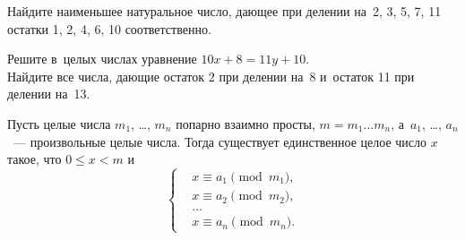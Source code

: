 


\begingroup
    \ifdefined\mathup
        \providecommand\eulerphi{\mathup{\mupphi}}%
    \fi
    \ifdefined\upphi
        \providecommand\eulerphi{\upphi}%
    \fi
    \providecommand\eulerphi{\phi}%

\begin{exercises}

\item
Найдите наименьшее натуральное число, дающее при делении на~2, 3, 5, 7, 11
остатки 1, 2, 4, 6, 10 соответственно.

\item{}
\subproblem
Решите в~целых числах уравнение $10 x + 8 = 11 y + 10$.
\\
\subproblem
Найдите все числа, дающие остаток 2 при делении на~8 и~остаток 11 при делении на~13.

\end{exercises}

Пусть целые числа $m_{1}$, \ldots, $m_{n}$ попарно взаимно просты,
$m = m_{1} \ldots m_{n}$, а~$a_{1}$, \ldots, $a_{n}$~--- произвольные целые
числа.
Тогда существует единственное целое число $x$ такое, что $0 \leq x < m$ и%
\[ \left\{ \begin{aligned} &
    x \equiv a_1 \pmod {m_1}
, \\ &
    x \equiv a_2 \pmod {m_2}
, \\ & \ldots \\ &
    x \equiv a_n \pmod {m_n}
. \end{aligned} \right. \]

